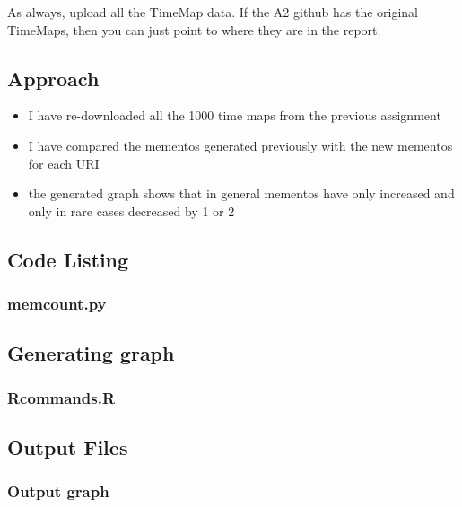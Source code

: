 \documentclass[12pt]{article}
\begin{document}
As always, upload all the TimeMap data.  If the A2 github has the 
original TimeMaps, then you can just point to where they are in 
the report.
\newpage
\subsection{Approach}
\begin{itemize}
\item I have re-downloaded all the 1000 time maps from the previous assignment
\item I have compared the mementos generated previously with the new mementos for each URI
\item the generated graph shows that in general mementos have only increased and only in rare cases decreased by 1 or 2

\end{itemize}
\subsection{Code Listing}
\subsubsection{memcount.py}



\subsection{Generating graph}
\subsubsection{Rcommands.R}



\subsection{Output Files}
\subsubsection{Output graph}
\end{document}
